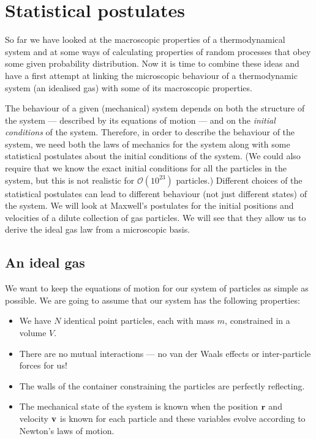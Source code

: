 \section{Statistical postulates}
So far we have looked at the macroscopic properties of a thermodynamical system and at some ways of calculating properties of random processes that obey some given probability distribution. Now it is time to combine these ideas and have a first attempt at linking the microscopic behaviour of a thermodynamic system (an idealised gas) with some of its macroscopic properties.

The behaviour of a given (mechanical) system depends on both the structure of the system --- described by its equations of motion --- and on the \emph{initial conditions} of the system. Therefore, in order to describe the behaviour of the system, we need both the laws of mechanics for the system along with some statistical postulates about the initial conditions of the system. (We could also require that we know the exact initial conditions for all the particles in the system, but this is not realistic for $\mathcal{O}(10^{23})$ particles.) Different choices of the statistical postulates can lead to different behaviour (not just different states) of the system. We will look at Maxwell's postulates for the initial positions and velocities of a dilute collection of gas particles. We will see that they allow us to derive the ideal gas law from a microscopic basis.

\subsection{An ideal gas}
We want to keep the equations of motion for our system of particles as simple as possible. We are going to assume   that our system has the following properties:
\begin{itemize}
\item We have $N$ identical  point particles, each with mass $m$, constrained in a volume $V$.
\item There are no mutual interactions --- no van der Waals effects or inter-particle forces for us!
\item The walls of the container constraining the particles are perfectly reflecting.
\item The mechanical state of the system is known when the position $\bf r$ and velocity $\bf v$ is known for each particle and these variables evolve according to Newton's laws of motion.
\end{itemize}

